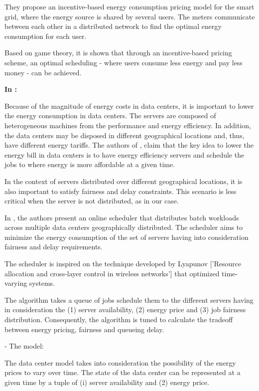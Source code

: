 They propose an incentive-based energy consumption pricing model for the smart
grid, where the energy source is shared by several users. The meters communicate
between each other in a distributed network to find the optimal energy
consumption for each user.

Based on game theory, it is shown that through an incentive-based pricing
scheme, an optimal scheduling - where users consume less energy and pay less
money - can be achieved.

\textbf{In \cite{EFF_JOB_SCHEDULING}:}

Because of the magnitude of energy costs in data centers, it is important to
lower the energy consumption in data centers. The servers are composed of
heterogeneous machines from the performance and energy efficiency. In addition,
the data centers may be disposed in different geographical locations and, thus,
have different energy tariffs. The authors of \cite{EFF_JOB_SCHEDULING}, claim that
the key idea to lower the energy bill in data centers is to have energy
efficiency servers and schedule the jobs to where energy is more affordable at a
given time.

In the context of servers distributed over different geographical locations, it
is also important to satisfy fairness and delay constraints. This scenario is
less critical when the server is not distributed, as in our case.

In \cite{EFF_JOB_SCHEDULING}, the authors present an online scheduler that
distributes batch workloads across multiple data centers geographically
distributed. The scheduler aims to minimize the energy consumption of the set of
servers having into consideration fairness and delay requirements.   

The scheduler is inspired on the technique developed by Lyapunov ['Resource
allocation and cross-layer control in wireless networks'] that
optimized time-varying systems. 

The algorithm takes a queue of jobs schedule them to the different servers
having in consideration the (1) server availability, (2) energy price and (3)
job fairness distribution. Consequently, the algorithm is tuned to calculate the
tradeoff between energy pricing, fairness and queueing delay.

- The model:

The data center model takes into consideration the possibility of the energy
prices to vary over time. The state of the data center can be represented at a
given time by a tuple of (i) server availability and (2) energy price.

